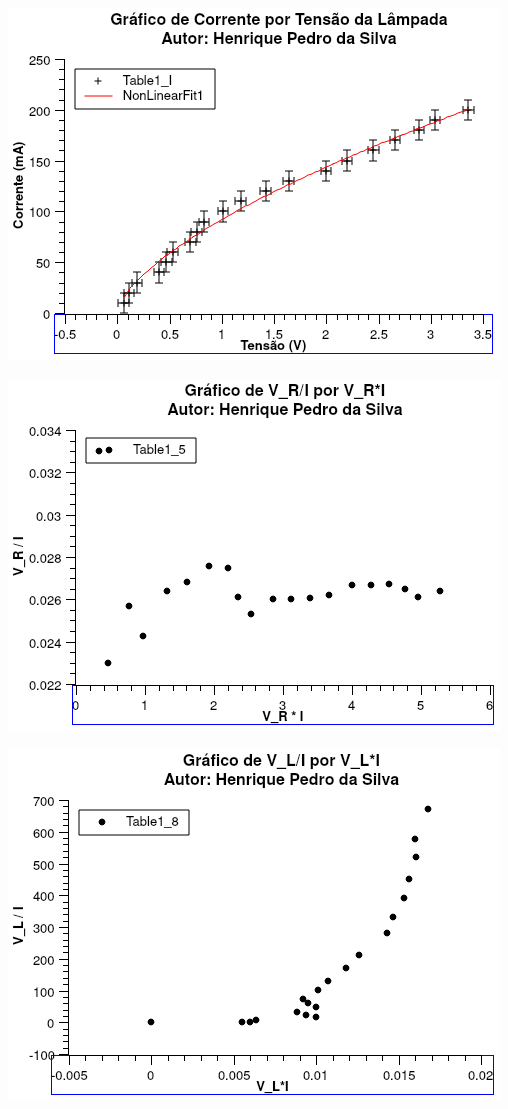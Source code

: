 \documentclass[12pt,twoside, a4paper, twocolumn]{article}
\begin{document}
\begin{adjustbox}{scale=0.70}
    \includegraphics{Graph3.png}
\end{adjustbox}

\begin{adjustbox}{scale=0.70}
    \includegraphics{Graph4.png}
\end{adjustbox}

\begin{adjustbox}{scale=0.70}
    \includegraphics{Graph5.png}
\end{adjustbox}
\end{document}
